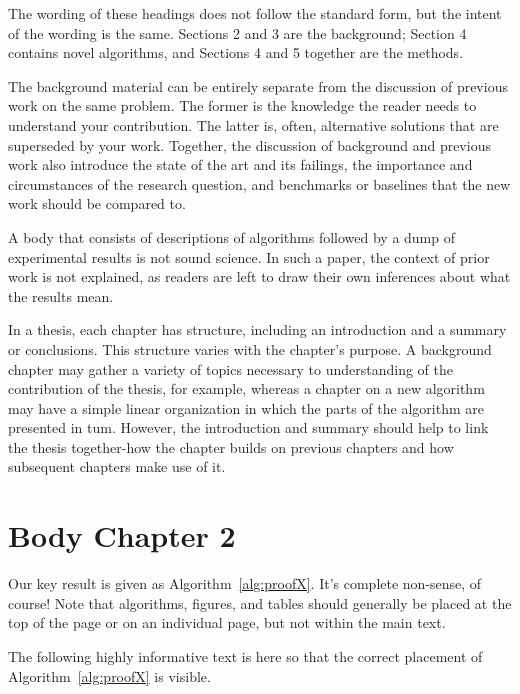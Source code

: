\documentclass[a4paper,oneside,bibliography=totoc]{scrbook}
\begin{document}
{  The wording of these headings does not follow the standard form, but the
  intent of the wording is the same. Sections 2 and 3 are the background;
  Section 4 contains novel algorithms, and Sections 4 and 5 together are the
  methods.

  The background material can be entirely separate from the discussion of
  previous work on the same problem. The former is the knowledge the reader
  needs to understand your contribution. The latter is, often, alternative
  solutions that are superseded by your work. Together, the discussion of
  background and previous work also introduce the state of the art and its
  failings, the importance and circumstances of the research question, and
  benchmarks or baselines that the new work should be compared to.

  A body that consists of descriptions of algorithms followed by a dump of
  experimental results is not sound science. In such a paper, the context of
  prior work is not explained, as readers are left to draw their own inferences
  about what the results mean.

  In a thesis, each chapter has structure, including an introduction and a
  summary or conclusions. This structure varies with the chapter's purpose. A
  background chapter may gather a variety of topics necessary to understanding
  of the contribution of the thesis, for example, whereas a chapter on a new
  algorithm may have a simple linear organization in which the parts of the
  algorithm are presented in tum. However, the introduction and summary should
  help to link the thesis together-how the chapter builds on previous chapters
  and how subsequent chapters make use of it. }

\chapter{Body Chapter 2}

Our key result is given as Algorithm~\ref{alg:proofX}. It's complete non-sense,
of course! Note that algorithms, figures, and tables should generally be placed
at the top of the page or on an individual page, but not within the main text.

The following highly informative text is here so that the correct placement of
Algorithm~\ref{alg:proofX} is visible. \lipsum[1-3]
\end{document}
